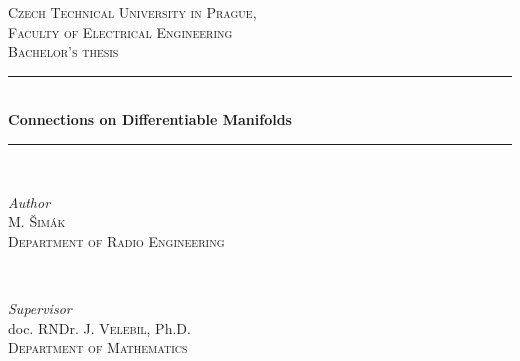 \documentclass[11pt,a4paper,twoside,openany]{report}
\theoremstyle{my-theorem}
\theoremstyle{non-theorem}
\begin{document}
	
	
	\begin{titlepage} %
		\newcommand{\HRule}{\rule{\linewidth}{0.5mm}} %
		
		\center %
		
		\textsc{\LARGE Czech Technical University in Prague,\\Faculty of Electrical Engineering}\\[1.5cm] %
		\textsc{\Large Bachelor's thesis}\\[0.5cm] %
		
		
		
		\HRule\\[0.6cm]
		
		{\huge\bfseries Connections on Differentiable Manifolds}\\[0.3cm] %
		
		\HRule\\[1.5cm]
		
		
		\begin{minipage}{0.45\textwidth}
			\begin{flushleft}
				\large
				\textit{Author}\\
				M. \textsc{Šimák}\\ %
				\textsc{Department of Radio Engineering} %
			\end{flushleft}
		\end{minipage}
		~
		\begin{minipage}{0.45\textwidth}
			\begin{flushright}
				\large
				\textit{Supervisor}\\
				doc. RNDr. J. \textsc{Velebil}, Ph.D.\\ %
				\textsc{Department of Mathematics} %
			\end{flushright}
		\end{minipage}
		

\end{titlepage}
\end{document}
